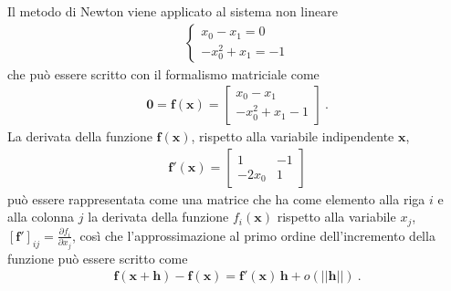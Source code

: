 \documentclass[letterpaper,10pt,italian]{jupyterBook}
\begin{document}
\sphinxAtStartPar
{} Il metodo di Newton viene applicato al sistema non lineare
\begin{equation*}
\begin{split}\begin{cases}
    x_0   - x_1 = 0 \\
  - x_0^2 + x_1 = -1
\end{cases}\end{split}
\end{equation*}
\sphinxAtStartPar
che può essere scritto con il formalismo matriciale come
\begin{equation*}
\begin{split}\mathbf{0} = \mathbf{f}(\mathbf{x}) = \begin{bmatrix} x_0 - x_1 \\ -x_0^2 + x_1 - 1 \end{bmatrix} \ .\end{split}
\end{equation*}
\sphinxAtStartPar
La derivata della funzione \(\mathbf{f}(\mathbf{x})\), rispetto alla variabile indipendente \(\mathbf{x}\),
\begin{equation*}
\begin{split}\mathbf{f}'(\mathbf{x}) = \begin{bmatrix} 1 & - 1 \\ - 2 x_0 & 1\end{bmatrix}\end{split}
\end{equation*}
\sphinxAtStartPar
può essere rappresentata come una matrice che ha come elemento alla riga \(i\) e alla colonna \(j\) la derivata della funzione \(f_i(\mathbf{x})\) rispetto alla variabile \(x_j\), \(\left[ \mathbf{f}' \right]_{ij} = \frac{\partial f_i}{\partial x_j}\), così che l’approssimazione al primo ordine dell’incremento della funzione può essere scritto come
\begin{equation*}
\begin{split}\mathbf{f}(\mathbf{x}+\mathbf{h}) - \mathbf{f}(\mathbf{x}) = \mathbf{f}'(\mathbf{x}) \, \mathbf{h} + o(||\mathbf{h}||) \ .\end{split}
\end{equation*}
\end{document}
